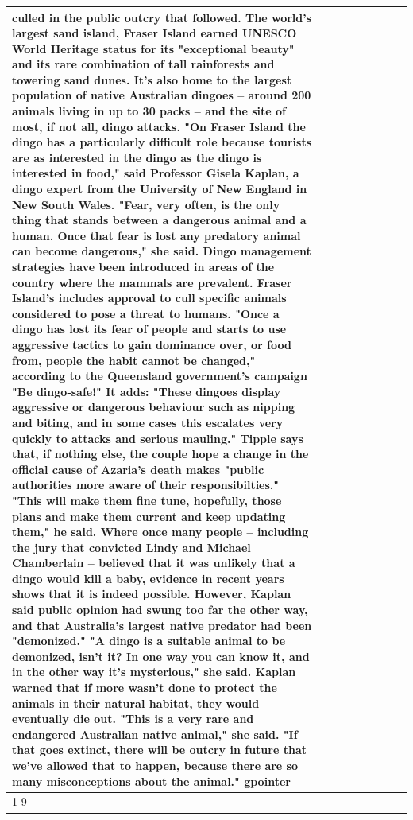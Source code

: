 \begin{table}[H]
\begin{tabular}{lllrlllll}
culled in the public outcry that followed. The world's largest sand island, Fraser Island earned UNESCO World Heritage status for its "exceptional beauty" and its rare combination of tall rainforests and towering sand dunes. It's also home to the largest population of native Australian dingoes -- around 200 animals living in up to 30 packs -- and the site of most, if not all, dingo attacks. "On Fraser Island the dingo has a particularly difficult role because tourists are as interested in the dingo as the dingo is interested in food," said Professor Gisela Kaplan, a dingo expert from the University of New England in New South Wales. "Fear, very often, is the only thing that stands between a dangerous animal and a human. Once that fear is lost any predatory animal can become dangerous," she said. Dingo management strategies have been introduced in areas of the country where the mammals are prevalent. Fraser Island's includes approval to cull specific animals considered to pose a threat to humans. "Once a dingo has lost its fear of people and starts to use aggressive tactics to gain dominance over, or food from, people the habit cannot be changed," according to the Queensland government's campaign "Be dingo-safe!" It adds: "These dingoes display aggressive or dangerous behaviour such as nipping and biting, and in some cases this escalates very quickly to attacks and serious mauling." Tipple says that, if nothing else, the couple hope a change in the official cause of Azaria's death makes "public authorities more aware of their responsibilties." "This will make them fine tune, hopefully, those plans and make them current and keep updating them," he said. Where once many people -- including the jury that convicted Lindy and Michael Chamberlain -- believed that it was unlikely that a dingo would kill a baby, evidence in recent years shows that it is indeed possible. However, Kaplan said public opinion had swung too far the other way, and that Australia's largest native predator had been "demonized." "A dingo is a suitable animal to be demonized, isn't it? In one way you can know it, and in the other way it's mysterious," she said. Kaplan warned that if more wasn't done to protect the animals in their natural habitat, they would eventually die out. "This is a very rare and endangered Australian native animal," she said. "If that goes extinct, there will be outcry in future that we've allowed that to happen, because there are so many misconceptions about the animal." gpointer \\
\cline{1-9}

\end{tabular}
\end{table}
